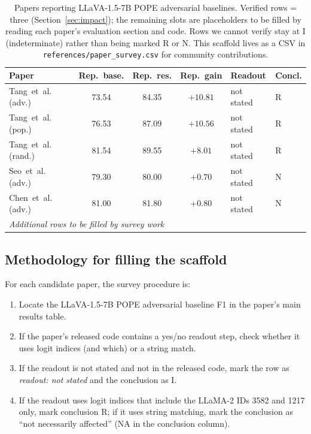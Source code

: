 \documentclass[11pt,letterpaper]{article}
\begin{document}
\begin{table}[h]
\caption{Papers reporting LLaVA-1.5-7B POPE adversarial baselines.
Verified rows = three (Section~\ref{sec:impact}); the remaining slots
are placeholders to be filled by reading each paper's evaluation
section and code. Rows we cannot verify stay at I (indeterminate)
rather than being marked R or N. This scaffold lives as a CSV in
\texttt{references/paper\_survey.csv} for community contributions.}
\label{tab:survey}
\centering
\small
\setlength{\tabcolsep}{4pt}
\begin{tabular}{@{}lcccll@{}}
\toprule
Paper & Rep.~base. & Rep.~res. & Rep.~gain & Readout & Concl. \\
\midrule
Tang~et~al.~\citep{visflow2025} (adv.)  & 73.54 & 84.35 & $+10.81$ & not stated & R \\
Tang~et~al.~\citep{visflow2025} (pop.)  & 76.53 & 87.09 & $+10.56$ & not stated & R \\
Tang~et~al.~\citep{visflow2025} (rand.) & 81.54 & 89.55 & $+8.01$  & not stated & R \\
Seo~et~al.~\citep{seo2025} (adv.)       & 79.30 & 80.00 & $+0.70$  & not stated & N \\
Chen~et~al.~\citep{adaptvis2025} (adv.) & 81.00 & 81.80 & $+0.80$  & not stated & N \\
\midrule
\multicolumn{6}{l}{\emph{Additional rows to be filled by survey work}} \\
\bottomrule
\end{tabular}
\end{table}

\subsection{Methodology for filling the scaffold}

For each candidate paper, the survey procedure is:

\begin{enumerate}[leftmargin=*,nosep]
\item Locate the LLaVA-1.5-7B POPE adversarial baseline F1 in the
      paper's main results table.
\item If the paper's released code contains a yes/no readout step,
      check whether it uses logit indices (and which) or a string
      match.
\item If the readout is not stated and not in the released code,
      mark the row as \emph{readout: not stated} and the conclusion
      as I.
\item If the readout uses logit indices that include the LLaMA-2 IDs
      3582 and 1217 only, mark conclusion R; if it uses string
      matching, mark the conclusion as ``not necessarily affected''
      (NA in the conclusion column).
\end{enumerate}
\end{document}
